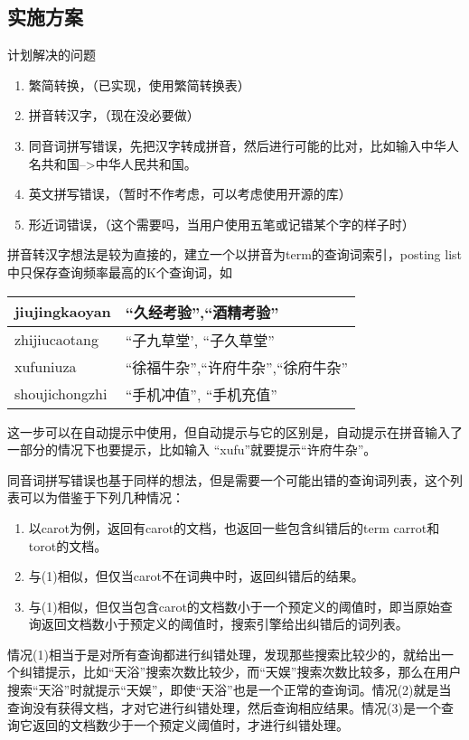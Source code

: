 \subsection{实施方案}
\par 计划解决的问题
\begin{enumerate}[(1)]
\item 繁简转换，（已实现，使用繁简转换表）
\item 拼音转汉字，（现在没必要做）
\item 同音词拼写错误，先把汉字转成拼音，然后进行可能的比对，比如输入中华人名共和国-->中华人民共和国。
\item 英文拼写错误，（暂时不作考虑，可以考虑使用开源的库）
\item 形近词错误，（这个需要吗，当用户使用五笔或记错某个字的样子时）
\end{enumerate}
\par 拼音转汉字想法是较为直接的，建立一个以拼音为term的查询词索引，posting list中只保存查询频率最高的K个查询词，如
\begin{table}[h]
  \centering
  \begin{tabular}{|l|l|}
\hline
jiujingkaoyan &“久经考验”,“酒精考验”\\ \hline
zhijiucaotang & “子九草堂', “子久草堂” \\ \hline
xufuniuza & “徐福牛杂”,“许府牛杂”,“徐府牛杂”\\ \hline
shoujichongzhi&“手机冲值”, “手机充值”\\ \hline
  \end{tabular}
\end{table}
\par 这一步可以在自动提示中使用，但自动提示与它的区别是，自动提示在拼音输入了一部分的情况下也要提示，比如输入 “xufu”就要提示“许府牛杂”。
\par 同音词拼写错误也基于同样的想法，但是需要一个可能出错的查询词列表，这个列表可以为借鉴于下列几种情况：
\begin{enumerate}[(1)]
\item 以carot为例，返回有carot的文档，也返回一些包含纠错后的term carrot和torot的文档。
\item 与(1)相似，但仅当carot不在词典中时，返回纠错后的结果。
\item 与(1)相似，但仅当包含carot的文档数小于一个预定义的阈值时，即当原始查询返回文档数小于预定义的阈值时，搜索引擎给出纠错后的词列表。
\end{enumerate}
\par 情况(1)相当于是对所有查询都进行纠错处理，发现那些搜索比较少的，就给出一个纠错提示，比如“天浴”搜索次数比较少，而“天娱”搜索次数比较多，那么在用户搜索“天浴”时就提示“天娱”，即使“天浴”也是一个正常的查询词。情况(2)就是当查询没有获得文档，才对它进行纠错处理，然后查询相应结果。情况(3)是一个查询它返回的文档数少于一个预定义阈值时，才进行纠错处理。
